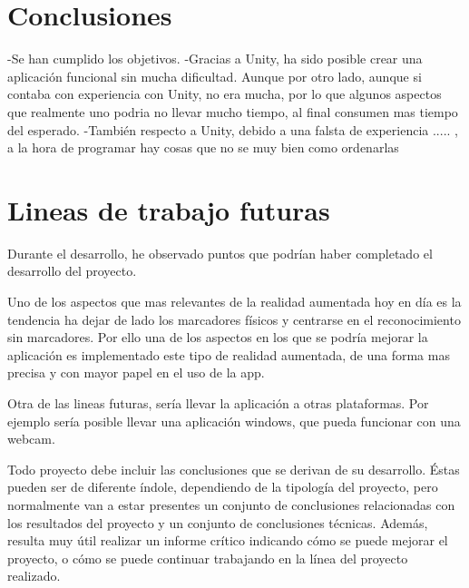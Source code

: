 

\section{Conclusiones}
-Se han cumplido los objetivos.
-Gracias a Unity, ha sido posible crear una aplicación funcional sin mucha dificultad.
Aunque por otro lado, aunque si contaba con experiencia con Unity, no era mucha, por lo que algunos aspectos que realmente uno podria no llevar mucho tiempo, al final consumen mas tiempo del esperado.
-También respecto a Unity, debido a una falsta de experiencia ..... , a la hora de programar hay cosas que no se muy bien como ordenarlas

\section{Lineas de trabajo futuras}
Durante el desarrollo, he observado puntos que podrían haber completado el desarrollo del proyecto.

Uno de los aspectos que mas relevantes de la realidad aumentada hoy en día es la tendencia ha dejar de lado los marcadores físicos y centrarse en el reconocimiento sin marcadores.
Por ello una de los aspectos en los que se podría mejorar la aplicación es implementado este tipo de realidad aumentada, de una forma mas precisa y con mayor papel en el uso de la app.

Otra de las lineas futuras, sería llevar la aplicación a otras plataformas. Por ejemplo sería posible llevar una aplicación windows, que pueda funcionar con una webcam.

Todo proyecto debe incluir las conclusiones que se derivan de su desarrollo. Éstas pueden ser de diferente índole, dependiendo de la tipología del proyecto, pero normalmente van a estar presentes un conjunto de conclusiones relacionadas con los resultados del proyecto y un conjunto de conclusiones técnicas. 
Además, resulta muy útil realizar un informe crítico indicando cómo se puede mejorar el proyecto, o cómo se puede continuar trabajando en la línea del proyecto realizado. 
